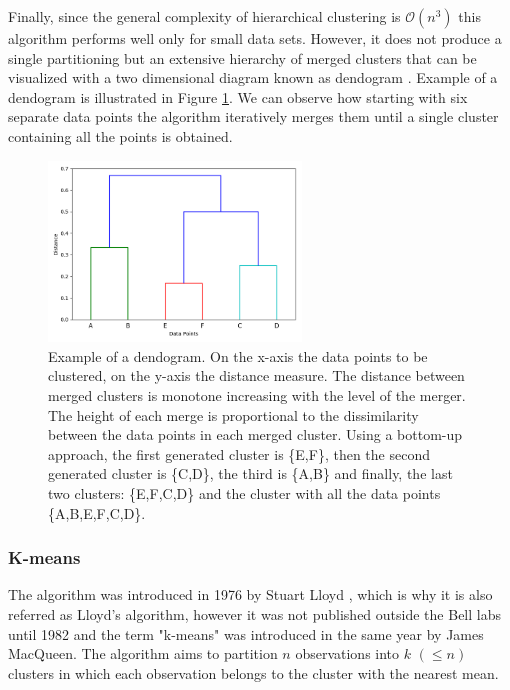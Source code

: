 Finally, since the general complexity of hierarchical clustering is $\mathcal{O}(n^3)$ this algorithm performs well only for small data sets. However, it does not produce a single partitioning but an extensive hierarchy of merged clusters that can be visualized with a two dimensional diagram known as dendogram \cite{everitt_hierarchical_2011}. Example of a dendogram is illustrated in Figure \ref{fig:dendogram_example}. We can observe how starting with six separate data points the algorithm iteratively merges them until a single cluster containing all the points is obtained.
\begin{figure}[h]
    \centering
    \includegraphics[width=0.6\textwidth]{masters-thesis-master/masters-thesis/contents/02_background/dendogram_example.png}
    \caption{Example of a dendogram. On the x-axis the data points to be clustered, on the y-axis the distance measure. The distance between merged clusters is monotone increasing with the level of the merger. The height of each merge is proportional to the dissimilarity between the data points in each merged cluster. Using a bottom-up approach, the first generated cluster is \{E,F\}, then the second generated cluster is \{C,D\}, the third is \{A,B\} and finally, the last two clusters: \{E,F,C,D\} and the cluster with all the data points \{A,B,E,F,C,D\}.}
    \label{fig:dendogram_example}
\end{figure}

\subsubsection*{K-means}
The algorithm was introduced in 1976 by Stuart Lloyd \cite{lloyd_least_1982}, which is why it is also referred as Lloyd's algorithm, however it was not published outside the Bell labs until 1982 and the term "k-means" was introduced in the same year by James MacQueen. The algorithm aims to partition $n$ observations into $k$  $(\leq n)$ clusters in which each observation belongs to the cluster with the nearest mean. 

